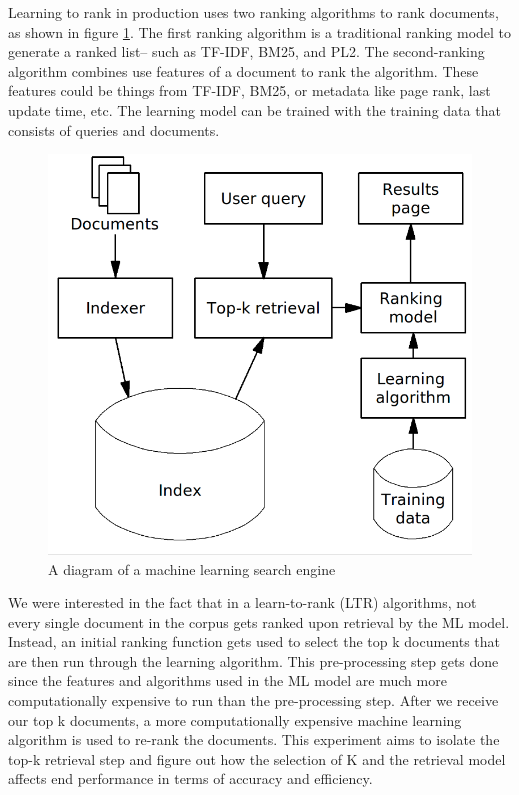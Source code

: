 \documentclass[letterpaper,12pt]{article}
\begin{document}
Learning to rank in production uses two ranking algorithms to rank documents, as shown in figure \ref{fig:ltr_pipeline}. 
The first ranking algorithm is a traditional ranking model to generate a ranked list-- such as TF-IDF, BM25, and PL2.
The second-ranking algorithm combines use features of a document to rank the algorithm.
These features could be things from TF-IDF, BM25, or metadata like page rank, last update time, etc.
The learning model can be trained with the training data that consists of queries and documents.

\begin{figure}[h!]
    \centering  %
    \includegraphics[width=.80\textwidth]{model.png} %
    \caption{A diagram of a machine learning search engine} %
    \label{fig:ltr_pipeline} %
\end{figure}


We were interested in the fact that in a learn-to-rank (LTR) algorithms, not every single document in the corpus gets ranked upon retrieval by the ML model.
Instead, an initial ranking function gets used to select the top k documents that are then run through the learning algorithm.
This pre-processing step gets done since the features and algorithms used in the ML model are much more computationally expensive to run than the pre-processing step.
After we receive our top k documents, a more computationally expensive machine learning algorithm is used to re-rank the documents.
This experiment aims to isolate the top-k retrieval step and figure out how the selection of K and the retrieval model affects end performance in terms of accuracy and efficiency.
\end{document}
